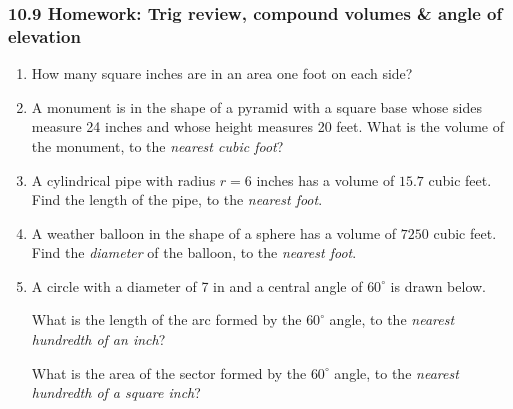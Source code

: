 \documentclass[12pt, twoside]{article}
\begin{document}
\subsubsection*{10.9 Homework: Trig review, compound volumes \& angle of elevation}
 \begin{enumerate}

  \item How many square inches are in an area one foot on each side? \vspace{2.5cm}

  \item A monument is in the shape of a pyramid with a square base whose sides measure 24 inches and whose height measures 20 feet. What is the volume of the monument, to the \emph{nearest cubic foot}? \vspace{3.5cm}

  \item A cylindrical pipe with radius $r=6$ inches has a volume of $15.7$ cubic feet. Find the length of the pipe, to the \emph{nearest foot}. \vspace{3.5cm}

  \item A weather balloon in the shape of a sphere has a volume of $7250$ cubic feet. Find the \emph{diameter} of the balloon, to the \emph{nearest foot}. \vspace{3.5cm}

\newpage

  \item A circle with a diameter of 7 in and a central angle of $60^\circ$ is drawn below.
       \begin{center}
     \end{center}
  What is the length of the arc formed by the $60^\circ$ angle, to the \emph{nearest hundredth of an inch}? \vspace{2.5cm}

  What is the area of the sector formed by the $60^\circ$ angle, to the \emph{nearest hundredth of a square inch}? \vspace{2.5cm}



\end{enumerate}
\end{document}
